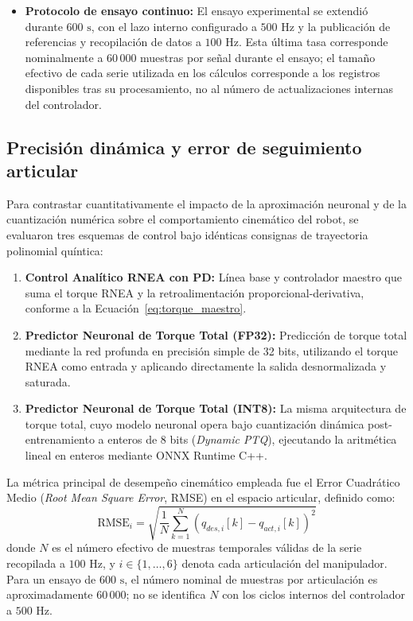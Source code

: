 \documentclass[12pt]{article}
\begin{document}
\begin{itemize}
    \item \textbf{Protocolo de ensayo continuo:} El ensayo experimental se extendió durante $600\text{ s}$, con el lazo interno configurado a $500\text{ Hz}$ y la publicación de referencias y recopilación de datos a $100\text{ Hz}$. Esta última tasa corresponde nominalmente a $60\,000$ muestras por señal durante el ensayo; el tamaño efectivo de cada serie utilizada en los cálculos corresponde a los registros disponibles tras su procesamiento, no al número de actualizaciones internas del controlador.
\end{itemize}

\subsection{Precisión dinámica y error de seguimiento articular}
\label{sec:precision_dinamica}

Para contrastar cuantitativamente el impacto de la aproximación neuronal y de la cuantización numérica sobre el comportamiento cinemático del robot, se evaluaron tres esquemas de control bajo idénticas consignas de trayectoria polinomial quíntica:

\begin{enumerate}
    \item \textbf{Control Analítico RNEA con PD:} Línea base y controlador maestro que suma el torque RNEA y la retroalimentación proporcional-derivativa, conforme a la Ecuación~\eqref{eq:torque_maestro}.
    \item \textbf{Predictor Neuronal de Torque Total (FP32):} Predicción de torque total mediante la red profunda en precisión simple de 32 bits, utilizando el torque RNEA como entrada y aplicando directamente la salida desnormalizada y saturada.
    \item \textbf{Predictor Neuronal de Torque Total (INT8):} La misma arquitectura de torque total, cuyo modelo neuronal opera bajo cuantización dinámica post-entrenamiento a enteros de 8 bits (\textit{Dynamic PTQ}), ejecutando la aritmética lineal en enteros mediante ONNX Runtime C++.
\end{enumerate}

La métrica principal de desempeño cinemático empleada fue el Error Cuadrático Medio (\textit{Root Mean Square Error}, RMSE) en el espacio articular, definido como:
\begin{equation}
    \text{RMSE}_i = \sqrt{\frac{1}{N} \sum_{k=1}^{N} \left( q_{des,i}[k] - q_{act,i}[k] \right)^2}
    \label{eq:rmse_def}
\end{equation}
donde $N$ es el número efectivo de muestras temporales válidas de la serie recopilada a $100\text{ Hz}$, y $i \in \{1, \dots, 6\}$ denota cada articulación del manipulador. Para un ensayo de $600\text{ s}$, el número nominal de muestras por articulación es aproximadamente $60\,000$; no se identifica $N$ con los ciclos internos del controlador a $500\text{ Hz}$.
\end{document}
